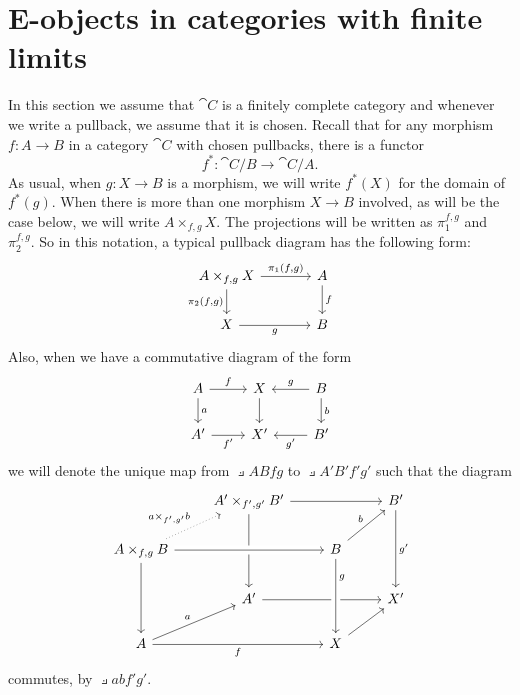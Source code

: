\section{E-objects in categories with finite limits}
In this section we assume that $\cat{C}$ is a finitely complete category and
whenever we write a pullback, we assume that it is chosen. Recall that for
any morphism $f:A\to B$ in a category $\cat{C}$ with chosen pullbacks, there
is a functor
\begin{equation*}
f^\ast : \cat{C}/B\to\cat{C}/A.
\end{equation*}
As usual, when $g:X\to B$ is a morphism, we will write $f^\ast(X)$ for the
domain of $f^\ast(g)$. When there is more than one morphism $X\to B$ involved,
as will be the case below, we will write $A\times_{f,g}X$. The projections
will be written as $\pi_1^{f,g}$ and $\pi_2^{f,g}$. So in this notation, a
typical pullback diagram has the following form:
\begin{equation*}
\begin{tikzcd}[column sep=large]
\pullback{A}{X}{f}{g}
  \ar{r}{\pullbackpr{1}{f}{g}}
  \ar{d}[swap]{\pullbackpr{2}{f}{g}}
  &
A \ar{d}{f}
  \\
X \ar{r}[swap]{g}
  &
B
\end{tikzcd}
\end{equation*}
Also, when we have a commutative diagram of the form
\begin{equation*}
\begin{tikzcd}
A \ar{r}{f}
  \ar{d}{a}
  &
X \ar{d}
  & 
B \ar{l}[swap]{g}
  \ar{d}{b}
  \\
A'
  \ar{r}[swap]{f'}
  &
X'
  &
B'
  \ar{l}{g'}
\end{tikzcd}
\end{equation*}
we will denote the unique map from $\pullback{A}{B}{f}{g}$ to $\pullback{A'}{B'}{f'}{g'}$
such that the diagram
\begin{equation*}
\begin{tikzcd}
  {}
  & 
\pullback{A'}{B'}{f'}{g'}
  \ar{dd}
  \ar{rr}
  &
  &
B'
  \ar{dd}{g'}
  \\
\pullback{A}{B}{f}{g}
  \ar{dd}
  \ar[crossing over]{rr}
  \ar[dotted]{ur}{\pullback{a}{b}{f'}{g'}}
  &
  &
B \ar{ur}{b}
  \\
  {}
  &
A'
  \ar{rr}
  &
  &
X'
  \\
A \ar{rr}[swap]{f}
  \ar{ur}{a}
  &
  &
X \ar[crossing over,leftarrow]{uu}[near end,swap]{g}
  \ar{ur}
\end{tikzcd}
\end{equation*}
commutes, by $\pullback{a}{b}{f'}{g'}$.
